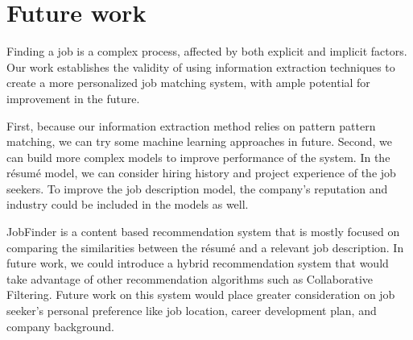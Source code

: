 \section{Future work}

Finding a job is a complex process, affected by both explicit and implicit factors. Our work establishes the validity of using information extraction techniques to create a more personalized job matching system, with ample potential for improvement in the future.

First, because our information extraction method relies on pattern pattern matching, we can try some machine learning approaches in future. Second, we can build more complex models to improve performance of the system. In the r\'esum\'e model, we can consider hiring history and project experience of the job seekers. To improve the job description model, the company's reputation and industry could be included in the models as well.

JobFinder is a content based recommendation system that is mostly focused on comparing the similarities between the r\'esum\'e and a relevant job description. In future work, we could introduce a hybrid recommendation system that would take advantage of other recommendation algorithms such as Collaborative Filtering. Future work on this system would place greater consideration on job seeker's personal preference like job location, career development plan, and company background.
